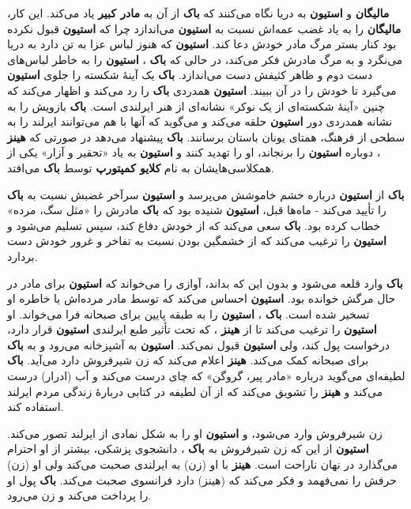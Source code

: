 \documentclass[12pt]{book}
\newcommand{\noun}[1]{{\textbf{#1}}}
\begin{document}
    \noun{مالیگان} و \noun{استیون} به دریا نگاه می‌کنند که \noun{باک}  از آن به \noun{مادر کبیر} یاد می‌کند. این کار، \noun{مالیگان} را به یاد غضب عمه‌اش نسبت به \noun{استیون} می‌اندازد چرا که \noun{استیون} قبول نکرده بود کنار بستر مرگ مادر خودش دعا کند. \noun{استیون} که هنوز لباس عزا به تن دارد به دریا می‌نگرد و به مرگ مادرش فکر می‌کند، در حالی که \noun{باک} ، \noun{استیون} را به خاطر لباس‌‌های دست دوم و ظاهر کثیفش دست می‌اندازد. \noun{باک}  یک آینهٔ شکسته را جلوی \noun{استیون} می‌گیرد تا خودش را در آن ببیند. \noun{استیون} همدردی \noun{باک}  را رد می‌کند و اظهار می‌کند که چنین «آینهٔ شکسته‌ای از یک نوکر» نشانه‌ای از هنر ایرلندی است. \noun{باک}  بازویش را به نشانه همدردی دور \noun{استیون} حلقه می‌کند و می‌گوید که آنها با هم می‌توانند ایرلند را به سطحی از فرهنگ، همتای یونان باستان برسانند. \noun{باک}  پیشنهاد می‌دهد در صورتی که \noun{هینز} ، دوباره \noun{استیون} را برنجاند، او را تهدید کنند و \noun{استیون} به یاد «تحقیر و آزار» یکی از همکلاسی‌هایشان به نام \noun{کلایو کمپتورپ} توسط \noun{باک}  می‌افتد.

    \noun{باک}  از \noun{استیون} درباره خشم خاموشش می‌پرسد و \noun{استیون} سرآخر غضبش نسبت به \noun{باک}  را تأیید می‌کند - ماه‌ها قبل، \noun{استیون} شنیده بود که \noun{باک}  مادرش را «مثل سگ، مرده» خطاب کرده بود. \noun{باک}  سعی می‌کند که از خودش دفاع کند، سپس تسلیم می‌شود و \noun{استیون} را ترغیب می‌کند که از خشمگین بودن نسبت به تفاخر و غرور خودش دست بردارد.

    \noun{باک}  وارد قلعه می‌شود و بدون این که بداند، آوازی را می‌خواند که \noun{استیون} برای مادر در حال مرگش خوانده بود. \noun{استیون} احساس می‌کند که توسط مادر مرده‌اش یا خاطره او تسخیر شده است. \noun{باک} ، \noun{استیون} را به طبقه پایین برای صبحانه فرا می‌خواند. او \noun{استیون} را ترغیب می‌کند تا از \noun{هینز} ، که تحت تأثیر طبع ایرلندی \noun{استیون} قرار دارد، درخواست پول کند، ولی \noun{استیون} قبول نمی‌کند. \noun{استیون} به آشپزخانه می‌رود و به \noun{باک}  برای صبحانه کمک می‌کند. \noun{هینز}  اعلام می‌کند که زن شیرفروش دارد می‌آید. \noun{باک}  لطیفه‌ای می‌گوید درباره «مادر پیر، گروگن» که چای درست می‌کند و آب (ادرار) درست می‌کند و \noun{هینز}  را تشویق می‌کند که از آن لطیفه در کتابی دربارهٔ زندگی مردم ایرلند استفاده کند.

    زن شیرفروش وارد می‌شود، و \noun{استیون} او را به شکل نمادی از ایرلند تصور می‌کند. \noun{استیون} از این که زن شیرفروش به \noun{باک} ، دانشجوی پزشکی، بیشتر از او احترام می‌گذارد در نهان ناراحت است. \noun{هینز}  با او (زن) به ایرلندی صحبت می‌کند ولی او (زن) حرفش را نمی‌فهمد و فکر می‌کند که (هینز) دارد فرانسوی صحبت می‌کند. \noun{باک}  پول او را پرداخت می‌کند و زن می‌رود.
\end{document}

